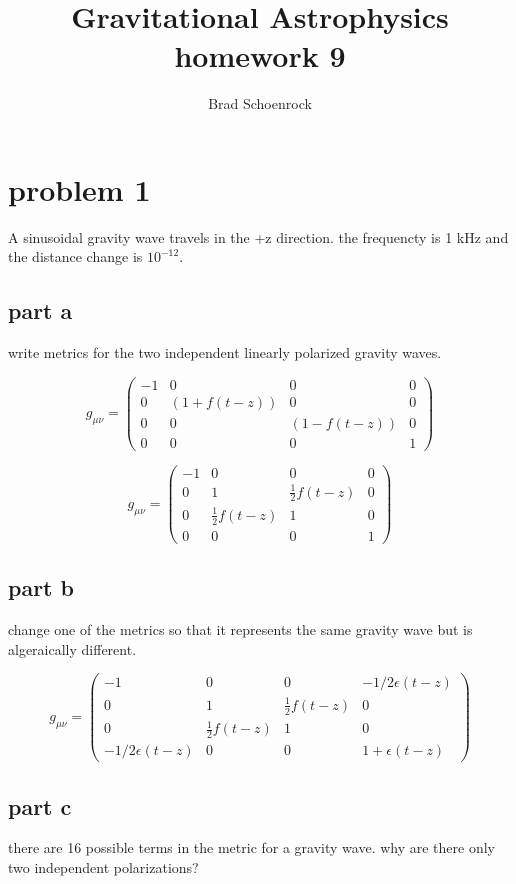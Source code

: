 \documentclass{article}
\title{Gravitational Astrophysics homework 9}
\author{Brad Schoenrock}
\date{}
\begin{document}
\maketitle
\Large
\section{problem 1}
A sinusoidal gravity wave travels in the +z direction. the frequencty is 1 kHz and the distance change is $10^{-12}$.

\subsection{part a}
write metrics for the two independent linearly polarized gravity waves.

\[ g_{\mu\nu} = \left( \begin{array}{cccc}
-1 & 0 & 0 & 0 \\
0 & (1+f(t-z)) & 0 & 0 \\
0 & 0 & (1-f(t-z)) & 0 \\
0 & 0 & 0 & 1 \end{array} \right)\] 

\[ g_{\mu\nu} = \left( \begin{array}{cccc}
-1 & 0 & 0 & 0 \\
0 & 1 & \frac{1}{2}f(t-z) & 0 \\
0 & \frac{1}{2}f(t-z) & 1 & 0 \\
0 & 0 & 0 & 1 \end{array} \right)\] 

\subsection{part b}
change one of the metrics so that it represents the same gravity wave but is algeraically different.

\[ g_{\mu\nu} = \left( \begin{array}{cccc}
-1 & 0 & 0 & -1/2\epsilon (t-z) \\
0 & 1 & \frac{1}{2}f(t-z) & 0 \\
0 & \frac{1}{2}f(t-z) & 1 & 0 \\
-1/2\epsilon (t-z) & 0 & 0 & 1+\epsilon (t-z) \end{array} \right)\] 

\subsection{part c}
there are 16 possible terms in the metric for a gravity wave. why are there only two independent polarizations?
\end{document}
